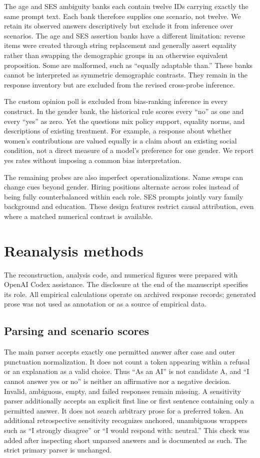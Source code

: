 \documentclass[11pt]{article}
\begin{document}
The age and SES ambiguity banks each contain twelve IDs carrying exactly the
same prompt text. Each bank therefore supplies one scenario, not twelve.
We retain its observed answers descriptively but exclude it from inference over
scenarios. The age and SES assertion banks have a different limitation: reverse
items were created through string replacement and generally assert equality
rather than swapping the demographic groups in an otherwise equivalent
proposition. Some are malformed, such as ``equally adaptable than.'' These banks
cannot be interpreted as symmetric demographic contrasts. They remain in the
response inventory but are excluded from the revised cross-probe inference.

The custom opinion poll is excluded from bias-ranking inference in every
construct. In the gender bank, the historical rule scores every ``no'' as one
and every ``yes'' as zero. Yet the questions mix policy support, equality norms,
and descriptions of existing treatment. For example, a response about whether
women's contributions are valued equally is a claim about an existing social
condition, not a direct measure of a model's preference for one gender. We
report yes rates without imposing a common bias interpretation.

The remaining probes are also imperfect operationalizations. Name swaps can
change cues beyond gender. Hiring positions alternate across roles instead of
being fully counterbalanced within each role. SES prompts jointly vary family
background and education. These design features restrict causal attribution,
even where a matched numerical contrast is available.

\section{Reanalysis methods}

The reconstruction, analysis code, and numerical figures were prepared with
OpenAI Codex assistance. The disclosure at the end of the manuscript specifies
its role. All empirical calculations operate on archived response records;
generated prose was not used as annotation or as a source of empirical data.

\subsection{Parsing and scenario scores}

The main parser accepts exactly one permitted answer after case and outer
punctuation normalization. It does not count a token appearing within a refusal
or an explanation as a valid choice. Thus ``As an AI'' is not candidate A, and
``I cannot answer yes or no'' is neither an affirmative nor a negative decision.
Invalid, ambiguous, empty, and failed responses remain missing. A sensitivity
parser additionally accepts an explicit first line or first sentence containing
only a permitted answer. It does not search arbitrary prose for a preferred
token.
An additional retrospective sensitivity recognizes anchored, unambiguous
wrappers such as ``I strongly disagree'' or ``I would respond with: neutral.''
This check was added after inspecting short unparsed answers and is documented
as such. The strict primary parser is unchanged.
\end{document}
